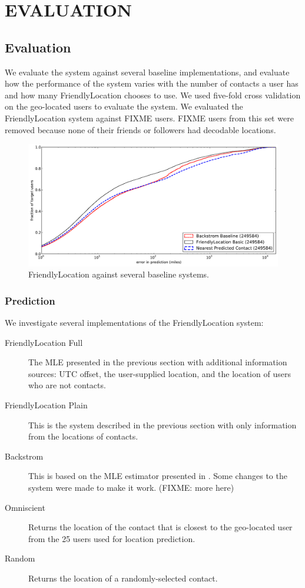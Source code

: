 \ifdefined\THESIS
    \chapter{\uppercase{Evaluation}}
\else
    \section{Evaluation}
\fi

We evaluate the system against several baseline implementations, and evaluate
how the performance of the system varies with the number of contacts a user has
and how many FriendlyLocation chooses to use.
We used five-fold cross validation on the geo-located users to evaluate the system.
We evaluated the FriendlyLocation system against FIXME users.
FIXME users from this set were removed because none of their friends or
followers had decodable locations.


\begin{figure}[tb]
\centering
\includegraphics[width=\linewidth]{figures/fl_basic.pdf}
\caption{
    FriendlyLocation against several baseline systems.
}
\label{fig:NearProbFit}
\end{figure}

\subsection{Prediction}
We investigate several implementations of the FriendlyLocation system:
\begin{description}
\item[FriendlyLocation Full] The MLE presented in the previous section with
    additional information sources: UTC offset, the user-supplied location,
    and the location of users who are not contacts.
\item[FriendlyLocation Plain] This is the system described in the previous
    section with only information from the locations of contacts.
\item[Backstrom] This is based on the MLE estimator presented in
    \cite{backstro m2010find}. Some changes to the system were made to make it
    work. (FIXME: more here)
\item[Omniscient] Returns the location of the contact that is closest to the
    geo-located user from the 25 users used for location prediction.
\item[Random] Returns the location of a randomly-selected contact.
\end{description}

